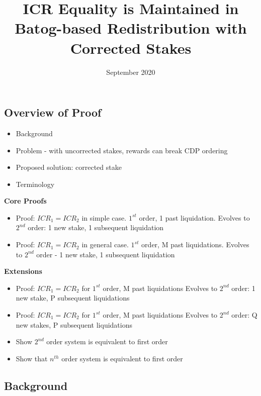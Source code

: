 \documentclass[reqno]{article}
\begin{document}
\title{\textbf{ICR Equality is Maintained in Batog-based Redistribution with Corrected Stakes}}
\date{September 2020}
\maketitle

\subsection*{\textbf{Overview of Proof}}


\begin{itemize}
  \item Background
  \item Problem - with uncorrected stakes, rewards can break CDP ordering
  \item Proposed solution: corrected stake
  \item Terminology
\end{itemize}

\bigskip
\textbf{Core Proofs}

\begin{itemize}
  \item Proof: $ICR_1=ICR_2$ in simple case. $1^{st}$ order, 1 past liquidation. Evolves to $2^{nd}$ order: 1 new stake, 1 subsequent liquidation
  \item Proof: $ICR_1=ICR_2$ in general case. $1^{st}$ order, M past liquidations. Evolves to $2^{nd}$ order - 1 new stake, 1 subsequent liquidation
\end{itemize}

\bigskip
\textbf{Extensions}

\begin{itemize}
  \item Proof: $ICR_1=ICR_2$ for $1^{st}$ order, M past liquidations Evolves to $2^{nd}$ order: 1 new stake, P subsequent liquidations
  \item Proof: $ICR_1=ICR_2$ for $1^{st}$ order, M past liquidations Evolves to $2^{nd}$ order: Q new stakes, P subsequent liquidations
  \item Show $2^{nd}$ order system is equivalent to first order 
  \item Show that $n^{th}$ order system is equivalent to first order
\end{itemize}

\bigskip
\subsection*{\textbf{Background}}
\end{document}
